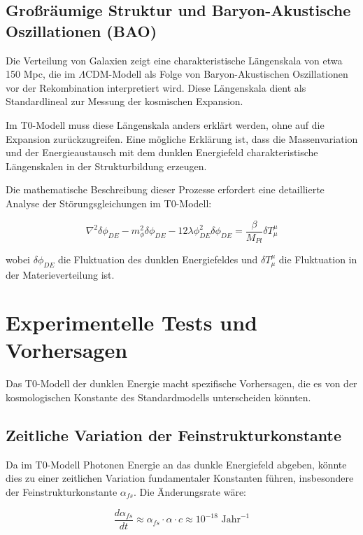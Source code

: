 \documentclass[a4paper,12pt]{article}
\begin{document}
\subsection{Großräumige Struktur und Baryon-Akustische Oszillationen (BAO)}

Die Verteilung von Galaxien zeigt eine charakteristische Längenskala von etwa 150 Mpc, die im $\Lambda$CDM-Modell als Folge von Baryon-Akustischen Oszillationen vor der Rekombination interpretiert wird. Diese Längenskala dient als Standardlineal zur Messung der kosmischen Expansion.

Im T0-Modell muss diese Längenskala anders erklärt werden, ohne auf die Expansion zurückzugreifen. Eine mögliche Erklärung ist, dass die Massenvariation und der Energieaustausch mit dem dunklen Energiefeld charakteristische Längenskalen in der Strukturbildung erzeugen.

Die mathematische Beschreibung dieser Prozesse erfordert eine detaillierte Analyse der Störungsgleichungen im T0-Modell:

\begin{equation}
	\nabla^2 \delta\phi_{DE} - m_{\phi}^2 \delta\phi_{DE} - 12\lambda\phi_{DE}^2 \delta\phi_{DE} = \frac{\beta}{M_{Pl}}\delta T^{\mu}_{\mu}
\end{equation}

wobei $\delta\phi_{DE}$ die Fluktuation des dunklen Energiefeldes und $\delta T^{\mu}_{\mu}$ die Fluktuation in der Materieverteilung ist.

\section{Experimentelle Tests und Vorhersagen}

Das T0-Modell der dunklen Energie macht spezifische Vorhersagen, die es von der kosmologischen Konstante des Standardmodells unterscheiden könnten.

\subsection{Zeitliche Variation der Feinstrukturkonstante}

Da im T0-Modell Photonen Energie an das dunkle Energiefeld abgeben, könnte dies zu einer zeitlichen Variation fundamentaler Konstanten führen, insbesondere der Feinstrukturkonstante $\alpha_{fs}$. Die Änderungsrate wäre:

\begin{equation}
	\frac{d\alpha_{fs}}{dt} \approx \alpha_{fs} \cdot \alpha \cdot c \approx 10^{-18} \text{ Jahr}^{-1}
\end{equation}
\end{document}
